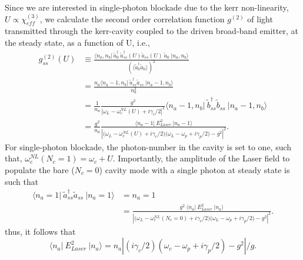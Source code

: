 \documentclass[12pt]{article}
\begin{document}
Since we are interested in single-photon blockade due to the kerr 
non-linearity, $U \propto \chi_{eff}^{(3)}$, we calculate the second order
correlation function $g^{(2)}$ of light transmitted through the kerr-cavity
coupled to the driven broad-band emitter, at the steady state, as a function
of U, i.e.,
\begin{equation}
\begin{split}
g^{(2)}_{ss}(U) &\equiv 
    \frac{ \langle n_a, n_b \vert \:
    \tilde{a}^{\dagger}_0 \: \tilde{a}^{\dagger}_{ss}(U)
    \tilde{a}_{ss}(U) \: \tilde{a}_0 \:
    \vert n_a, n_b \rangle }
    {(\langle \tilde{a}^{\dagger}_0\tilde{a}_0 \rangle)^2}
\\
&= \frac{n_a \langle n_a - 1, n_b \vert \:
    \tilde{a}^{\dagger}_{ss}\tilde{a}_{ss} \:
    \vert n_a - 1, n_b \rangle}
    {n_a^2}
\\
&= \frac{1}{n_a} 
    \frac{g^2}
    {\left\vert \omega_L - \omega_c^{NL}(U) + i\gamma_c/2 \right\vert^2}
    \langle n_a - 1, n_b \vert \:
    \tilde{b}^{\dagger}_{ss}\tilde{b}_{ss} \:
    \vert n_a - 1, n_b \rangle
\\
&= \frac{g^2}{n_a}
    \frac{\langle n_a-1 \vert \: E_{Laser}^2 \: \vert n_a-1 \rangle}
    {\left\vert \big( \omega_L - \omega_c^{NL}(U) + i\gamma_c/2 \big)
    \big( \omega_L - \omega_p + i\gamma_p/2 \big)
    -g^2 \right\vert^2}.
\end{split}
\end{equation}
For single-photon blockade, the photon-number in the cavity is set to one,
such that, $\omega_c^{NL}( N_c = 1 )  = \omega_c + U$. Importantly, the
amplitude of the Laser field to populate the bare ($N_c=0$) cavity mode 
with a single photon at steady state is such that
\begin{equation}
\begin{split}
\langle n_a=1 \vert \:
    \tilde{a}^{\dagger}_{ss} \tilde{a}_{ss} \:
    \vert n_a=1 \rangle 
    &= n_a = 1
\\
&= \frac{ g^2 \: 
    \langle n_a \vert \: E_{Laser}^2 \: \vert n_a \rangle}
    {\left\vert \big( \omega_L - \omega_c^{NL}(N_c=0) + i\gamma_c/2 \big)
    \big( \omega_L - \omega_p + i\gamma_p/2 \big)
    -g^2 \right\vert^2}.
\end{split}
\end{equation}
thus, it follows that
\begin{equation}
\langle n_a \vert \: E_{Laser}^2 \: \vert n_a \rangle = n_a
    \left\vert 
    ( i\gamma_c/2 )( \omega_c - \omega_p + i\gamma_p/2 ) -g^2 
    \right\vert
    / g.
\end{equation}
\end{document}
